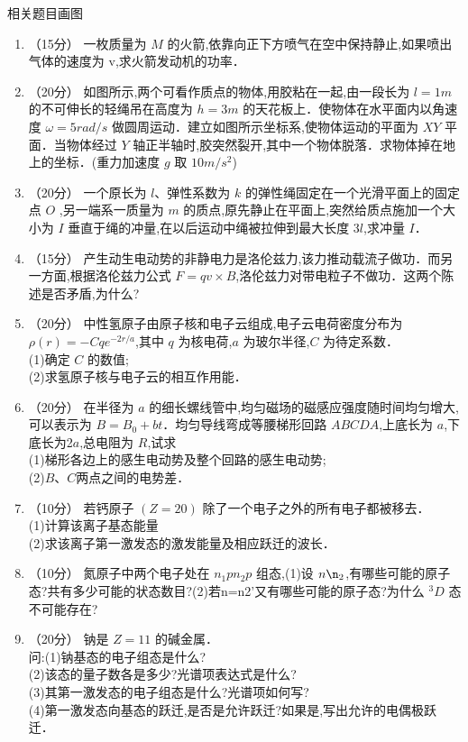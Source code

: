 
\begin{issues}
\issueTODO
相关题目画图
\end{issues}


\begin{enumerate}
\item （15分）
一枚质量为 $M$ 的火箭,依靠向正下方喷气在空中保持静止,如果喷出气体的速度为 $\mathrm v$,求火箭发动机的功率．
\item （20分）
如图所示,两个可看作质点的物体,用胶粘在一起,由一段长为 $l=1m$ 的不可伸长的轻绳吊在高度为 $h=3m$ 的天花板上．使物体在水平面内以角速度 $\omega=5rad/s$ 做圆周运动．建立如图所示坐标系,使物体运动的平面为 $XY$ 平面．当物体经过 $Y$ 轴正半轴时,胶突然裂开,其中一个物体脱落．求物体掉在地上的坐标．(重力加速度 $g$ 取 $10m/s^2$)
\item （20分）
一个原长为 $l$、弹性系数为 $k$ 的弹性绳固定在一个光滑平面上的固定点 $O$ ,另一端系一质量为 $m$ 的质点,原先静止在平面上,突然给质点施加一个大小为 $I$ 垂直于绳的冲量,在以后运动中绳被拉伸到最大长度 3$l$,求冲量 $I$．
\item （15分）
产生动生电动势的非静电力是洛伦兹力,该力推动载流子做功．而另一方面,根据洛伦兹力公式 $F=qv\times B$,洛伦兹力对带电粒子不做功．这两个陈述是否矛盾,为什么?
\item （20分）
中性氢原子由原子核和电子云组成,电子云电荷密度分布为 $\rho(r)=-Cqe^{-2r/a}$,其中 $q$ 为核电荷,$a$ 为玻尔半径,$C$ 为待定系数．\\
(1)确定 $C$ 的数值;\\
(2)求氢原子核与电子云的相互作用能．
\item （20分）
在半径为 $a$ 的细长螺线管中,均匀磁场的磁感应强度随时间均匀增大,可以表示为 $B=B_0+bt$．均匀导线弯成等腰梯形回路 $ABCDA$,上底长为 $a$,下底长为2$a$,总电阻为 $R$,试求\\
(1)梯形各边上的感生电动势及整个回路的感生电动势;\\
(2)$B$、$C$两点之间的电势差．
\item （10分）
若钙原子 $(Z=20)$ 除了一个电子之外的所有电子都被移去．\\
(1)计算该离子基态能量\\
(2)求该离子第一激发态的激发能量及相应跃迁的波长．
\item （10分）
氮原子中两个电子处在 $n_{1}pn_{2}p$ 组态,(1)设 $n\n_2$,有哪些可能的原子态?共有多少可能的状态数目?(2)若n=n2’又有哪些可能的原子态?为什么 $^{3}D$ 态不可能存在?
\item （20分） 
钠是 $Z=11$ 的碱金属．\\问:(1)钠基态的电子组态是什么?\\(2)该态的量子数各是多少?光谱项表达式是什么?\\(3)其第一激发态的电子组态是什么?光谱项如何写?\\(4)第一激发态向基态的跃迁,是否是允许跃迁?如果是,写出允许的电偶极跃迁．
\end{enumerate}